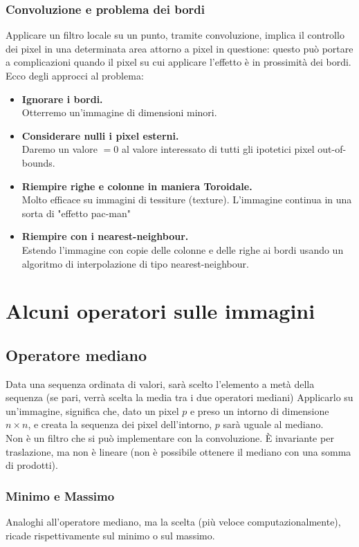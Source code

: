 \documentclass{report}
\begin{document}
	\subsection{Convoluzione e problema dei bordi}
	Applicare un filtro locale su un punto, tramite convoluzione, implica il controllo dei pixel in una determinata area attorno a pixel in questione: questo può portare a complicazioni quando il pixel su cui applicare l'effetto è in prossimità dei bordi. Ecco degli approcci al problema:
	\begin{itemize}
		\item \textbf{Ignorare i bordi.}\\
		      Otterremo un'immagine di dimensioni minori.
		\item \textbf{Considerare nulli i pixel esterni.}\\
		      Daremo un valore $=0$ al valore interessato di tutti gli ipotetici pixel out-of-bounds.
		\item \textbf{Riempire righe e colonne in maniera Toroidale.}\\
		      Molto efficace su immagini di tessiture (texture). L'immagine continua in una sorta di "effetto pac-man"
		\item \textbf{Riempire con i nearest-neighbour.}\\
		      Estendo l'immagine con copie delle colonne e delle righe ai bordi usando un algoritmo di interpolazione di tipo nearest-neighbour.
	\end{itemize}
	\chapter{Alcuni operatori sulle immagini}
	\section{Operatore mediano}
	Data una sequenza ordinata di valori, sarà scelto l'elemento a metà della sequenza (se pari, verrà scelta la media tra i due operatori mediani)
	Applicarlo su un'immagine, significa che, dato un pixel $p$ e preso un intorno di dimensione $n\times n$, e creata la sequenza dei pixel dell'intorno, $p$ sarà uguale al mediano.\\
	Non è un filtro che si può implementare con la convoluzione. È invariante per traslazione, ma non è lineare (non è possibile ottenere il mediano con una somma di prodotti).
	\subsection{Minimo e Massimo}
	Analoghi all'operatore mediano, ma la scelta (più veloce computazionalmente), ricade rispettivamente sul minimo o sul massimo.
	
\end{document}
